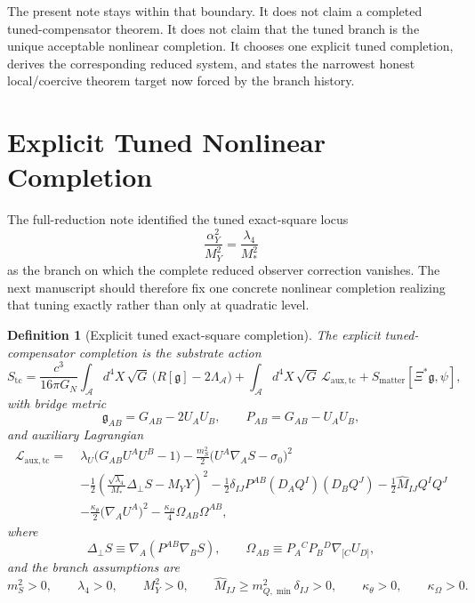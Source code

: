 \documentclass[11pt]{article}
\newcommand{\Sub}{\mathcal{A}}
\newcommand{\BridgeMetric}{\mathfrak{g}}
\newtheorem{definition}{Definition}
\begin{document}
The present note stays within that boundary. It does not claim a completed tuned-compensator theorem. It does not claim that the tuned branch is the unique acceptable nonlinear completion. It chooses one explicit tuned completion, derives the corresponding reduced system, and states the narrowest honest local/coercive theorem target now forced by the branch history.

\section{Explicit Tuned Nonlinear Completion}

The full-reduction note identified the tuned exact-square locus
\[
\frac{\alpha_Y^2}{M_Y^2}=\frac{\lambda_4}{M_*^2}
\]
as the branch on which the complete reduced observer correction vanishes. The next manuscript should therefore fix one concrete nonlinear completion realizing that tuning exactly rather than only at quadratic level.

\begin{definition}[Explicit tuned exact-square completion]
\label{def:Stc}
The \emph{explicit tuned-compensator completion} is the substrate action
\begin{equation}
S_{\mathrm{tc}}
=
\frac{c^3}{16\pi G_N}
\int_{\Sub} d^4X\,\sqrt{G}\,\bigl(R[\BridgeMetric]-2\Lambda_{\Sub}\bigr)
+ \int_{\Sub} d^4X\,\sqrt{G}\,\mathcal L_{\mathrm{aux,tc}}
+ S_{\mathrm{matter}}[\Xi^*\BridgeMetric,\psi],
\label{eq:Stc}
\end{equation}
with bridge metric
\begin{equation}
\BridgeMetric_{AB}=G_{AB}-2U_AU_B,
\qquad
P_{AB}=G_{AB}-U_AU_B,
\label{eq:bridge}
\end{equation}
and auxiliary Lagrangian
\begin{align}
\mathcal L_{\mathrm{aux,tc}}
=\;&
\lambda_U\bigl(G_{AB}U^AU^B-1\bigr)
-\frac{m_S^2}{2}\bigl(U^A\nabla_A S-\sigma_0\bigr)^2
\nonumber\\
&-\frac12
\left(
\frac{\sqrt{\lambda_4}}{M_*}\Delta_\perp S
- M_Y Y
\right)^2
-\frac12\delta_{IJ}P^{AB}(D_AQ^I)(D_BQ^J)
-\frac12\widehat M_{IJ}Q^IQ^J
\nonumber\\
&-\frac{\kappa_\theta}{2}\bigl(\nabla_AU^A\bigr)^2
-\frac{\kappa_\Omega}{4}\Omega_{AB}\Omega^{AB},
\label{eq:Lauxtc}
\end{align}
where
\begin{equation}
\Delta_\perp S\equiv \nabla_A\!\left(P^{AB}\nabla_BS\right),
\qquad
\Omega_{AB}\equiv P_A{}^CP_B{}^D\nabla_{[C}U_{D]},
\label{eq:defops}
\end{equation}
and the branch assumptions are
\begin{equation}
m_S^2>0,
\qquad
\lambda_4>0,
\qquad
M_Y^2>0,
\qquad
\widehat M_{IJ}\ge m_{Q,\min}^2\delta_{IJ}>0,
\qquad
\kappa_\theta>0,
\qquad
\kappa_\Omega>0.
\label{eq:positivity}
\end{equation}
\end{definition}
\end{document}
